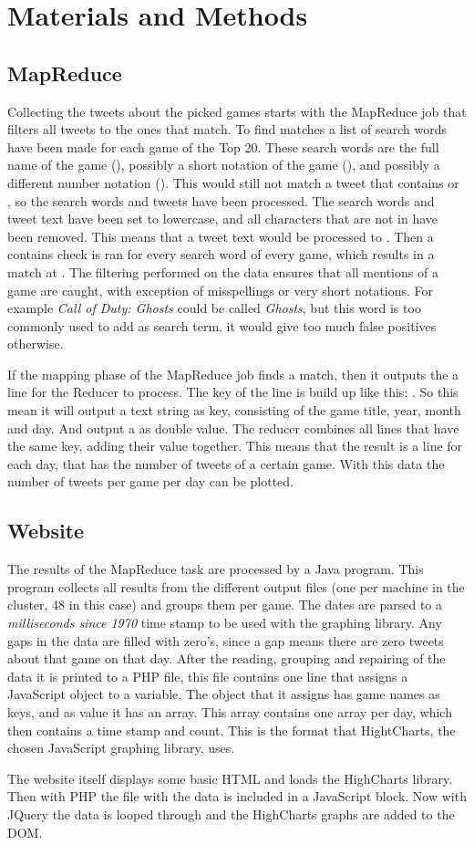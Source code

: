\section{Materials and Methods}
\subsection{MapReduce}
Collecting the tweets about the picked games starts with the MapReduce job that filters all tweets to the ones that match. To find matches a list of search words have been made for each game of the Top 20. These search words are the full name of the game (), possibly a short notation of the game (), and possibly a different number notation (). This would still not match a tweet that contains  or , so the search words and tweets have been processed. The search words and tweet text have been set to lowercase, and all characters that are not in  have been removed. This means that a tweet text  would be processed to . Then a contains check is ran for every search word of every game, which results in a match at . The filtering performed on the data ensures that all mentions of a game are caught, with exception of misspellings or very short notations. For example \emph{Call of Duty: Ghosts} could be called \emph{Ghosts}, but this word is too commonly used to add as search term, it would give too much false positives otherwise.

If the mapping phase of the MapReduce job finds a match, then it outputs the a line for the Reducer to process. The key of the line is build up like this: . So this mean it will output a text string as key, consisting of the game title, year, month and day. And output a  as double value. The reducer combines all lines that have the same key, adding their value together. This means that the result is a line for each day, that has the number of tweets of a certain game. With this data the number of tweets per game per day can be plotted.

\subsection{Website}
The results of the MapReduce task are processed by a Java program. This program collects all results from the different output files (one per machine in the cluster, 48 in this case) and groups them per game. The dates are parsed to a \emph{milliseconds since 1970} time stamp to be used with the graphing library. Any gaps in the data are filled with zero's, since a gap means there are zero tweets about that game on that day. After the reading, grouping and repairing of the data it is printed to a PHP file, this file contains one line that assigns a JavaScript object to a variable. The object that it assigns has game names as keys, and as value it has an array. This array contains one array per day, which then contains a time stamp and count. This is the format that HightCharts, the chosen JavaScript graphing library, uses.

The website itself displays some basic HTML and loads the HighCharts library. Then with PHP the file with the data is included in a JavaScript block. Now with JQuery the data is looped through and the HighCharts graphs are added to the DOM. 